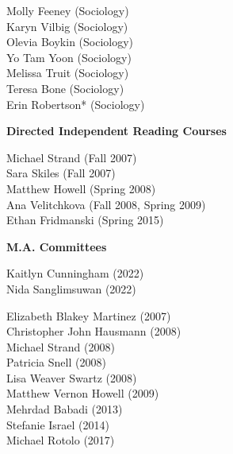 \begin{multicols}{2}
    \noindent
    Molly Feeney (Sociology) \\
    Karyn Vilbig (Sociology) \\ 
    Olevia Boykin (Sociology) \\
    Yo Tam Yoon (Sociology) \\
    Melissa Truit (Sociology) \\
    Teresa Bone (Sociology) \\
    Erin Robertson\textcolor{uclablue}{*} (Sociology)
\end{multicols}

\medskip
\noindent \textbf{Directed Independent Reading Courses} 

\begin{multicols}{2}
    \noindent
    Michael Strand (Fall 2007) \\
    Sara Skiles (Fall 2007) \\
    Matthew Howell (Spring 2008) \\
    Ana Velitchkova (Fall 2008, Spring 2009) \\
    Ethan Fridmanski (Spring 2015)
\end{multicols}

\medskip
\noindent \textbf{M.A. Committees}  
\begin{multicols}{2}
    \noindent
    Kaitlyn Cunningham (2022) \\
    Nida Sanglimsuwan (2022) 
\end{multicols}

\medskip
{}
\begin{multicols}{2}
    \noindent
    Elizabeth Blakey Martinez (2007) \\
    Christopher John Hausmann (2008) \\
    Michael Strand (2008) \\
    Patricia Snell (2008) \\
    Lisa Weaver Swartz (2008) \\
    Matthew Vernon Howell (2009) \\
    Mehrdad Babadi (2013) \\
    Stefanie Israel (2014) \\
    Michael Rotolo (2017)
\end{multicols}

